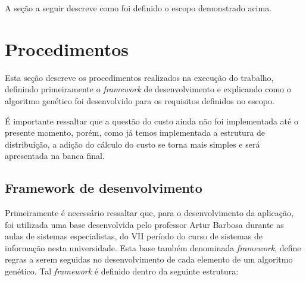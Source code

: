 \par A seção a seguir descreve como foi definido o escopo demonstrado acima.



\section{Procedimentos}

\par Esta seção descreve os procedimentos realizados na execução do trabalho,
definindo primeiramente o \textit{framework} de desenvolvimento e explicando
como o algoritmo genético foi desenvolvido para os requisitos definidos no escopo.

\par É importante ressaltar que a questão do custo ainda não foi implementada
até o presente momento, porém, como já temos implementada a estrutura de
distribuição, a adição do cálculo do custo se torna mais simples e será
apresentada na banca final.

\subsection{Framework de desenvolvimento}
\par Primeiramente é necessário ressaltar que, para o desenvolvimento da aplicação, foi utilizada uma base desenvolvida pelo professor Artur Barbosa durante as aulas de sistemas especialistas, do VII período do curso de sistemas de informação nesta universidade.
Esta base também denominada \textit{framework}, define regras a serem seguidas no desenvolvimento de cada elemento
de um algoritmo genético. Tal \textit{framework} é definido dentro da seguinte estrutura:

